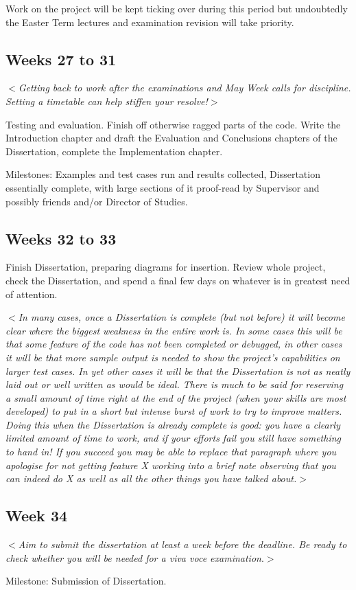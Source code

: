 \documentclass[12pt]{article}
\newcommand{\al}{$<$}
\newcommand{\ar}{$>$}
\begin{document}
Work on the project will be kept ticking over during this period but
undoubtedly the Easter Term lectures and examination revision will
take priority.


\subsection*{Weeks 27 to 31}

\al\emph{Getting back to work after the examinations and May Week
  calls for discipline.  Setting a timetable can help stiffen your
  resolve!}\ar

Testing and evaluation.  Finish off otherwise ragged parts of the
code.  Write the Introduction chapter and draft the Evaluation and
Conclusions chapters of the Dissertation, complete the Implementation
chapter.

Milestones: Examples and test cases run and results collected,
Dissertation essentially complete, with large sections of it
proof-read by Supervisor and possibly friends and/or Director of
Studies.


\subsection*{Weeks 32 to 33}

Finish Dissertation, preparing diagrams for insertion.  Review whole
project, check the Dissertation, and spend a final few days on
whatever is in greatest need of attention.

\al\emph{In many cases, once a Dissertation is complete (but not
  before) it will become clear where the biggest weakness in the
  entire work is.  In some cases this will be that some feature of the
  code has not been completed or debugged, in other cases it will be
  that more sample output is needed to show the project's capabilities
  on larger test cases.  In yet other cases it will be that the
  Dissertation is not as neatly laid out or well written as would be
  ideal.  There is much to be said for reserving a small amount of
  time right at the end of the project (when your skills are most
  developed) to put in a short but intense burst of work to try to
  improve matters.  Doing this when the Dissertation is already
  complete is good: you have a clearly limited amount of time to work,
  and if your efforts fail you still have something to hand in!  If
  you succeed you may be able to replace that paragraph where you
  apologise for not getting feature X working into a brief note
  observing that you can indeed do X as well as all the other things
  you have talked about.}\ar


\subsection*{Week 34}

\al\emph{Aim to submit the dissertation at least a week before the
  deadline. Be ready to check whether you will be needed for a\/ {\rm
    viva voce} examination}.\ar

Milestone: Submission of Dissertation. 
\end{document}
